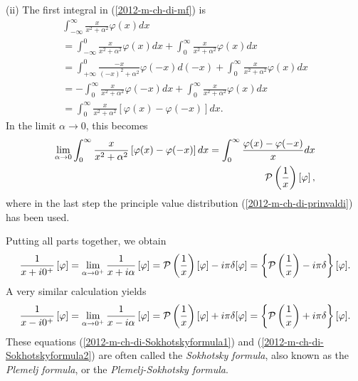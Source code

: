 (ii)
The first integral in (\ref{2012-m-ch-di-mf}) is
\begin{equation}
\begin{split}
\int_{-\infty}^\infty   \frac{x}{x^2+ \alpha^2}   \varphi(x) dx
\\
=
\int_{-\infty}^0   \frac{x}{x^2+ \alpha^2}   \varphi(x) dx
+
\int_{0}^\infty   \frac{x}{x^2+ \alpha^2}   \varphi(x) dx
\\
=
\int_{+\infty}^0   \frac{-x}{(-x)^2+ \alpha^2}   \varphi(-x) d(-x)
+
\int_{0}^\infty   \frac{x}{x^2+ \alpha^2}   \varphi(x) dx
\\
=
-\int_{0}^\infty   \frac{ x}{x^2+ \alpha^2}   \varphi(-x) dx
+
\int_{0}^\infty   \frac{x}{x^2+ \alpha^2}   \varphi(x) dx
\\
=
 \int_{0}^\infty   \frac{ x}{x^2+ \alpha^2} \left[  \varphi(x) - \varphi(-x) \right] dx
.
\end{split}
\end{equation}
In the limit $\alpha  \rightarrow 0$, this becomes
\begin{equation}
\begin{split}
\lim_{\alpha  \rightarrow 0} \int_{0}^\infty   \frac{ x}{x^2+ \alpha^2} \left[  \varphi(x) - \varphi(-x) \right] dx
=
\int_{0}^\infty   \frac{ \varphi(x) - \varphi(-x) }{x} dx
\\
{\cal P} \left(\frac{1}{x}\right) \left[\varphi\right]
,
\end{split}
\end{equation}
where in the last step the principle value distribution (\ref{2012-m-ch-di-prinvaldi})
has been used.

Putting all parts together, we obtain
\begin{equation}
\frac{1}{x+i0^+} \left[ \varphi \right]
= \lim_{\alpha  \rightarrow 0^+}\frac{1}{x+i\alpha} \left[ \varphi \right]
=  {\cal P} \left(\frac{1}{x}\right) \left[\varphi\right]
-i \pi \delta [\varphi ] = \left\{
{\cal P} \left(\frac{1}{x}\right) -i \pi \delta
\right\}  [\varphi ].
\label{2012-m-ch-di-Sokhotskyformula1}
\end{equation}
A very similar calculation yields
\begin{equation}
\frac{1}{x-i0^+} \left[ \varphi \right]
=
\lim_{\alpha  \rightarrow 0^+}\frac{1}{x-i\alpha} \left[ \varphi \right]
=  {\cal P} \left(\frac{1}{x}\right) \left[\varphi\right]
+i \pi \delta [\varphi ] = \left\{
{\cal P} \left(\frac{1}{x}\right) +i \pi \delta
\right\}  [\varphi ].
\label{2012-m-ch-di-Sokhotskyformula2}
\end{equation}
These equations
(\ref{2012-m-ch-di-Sokhotskyformula1})
and
(\ref{2012-m-ch-di-Sokhotskyformula2})
are often called the
{\em Sokhotsky  formula}, also known as the {\em Plemelj  formula}, or the {\em Plemelj-Sokhotsky formula}.\cite[-20mm]{Sokhotski-1873,Plemelj1908}




